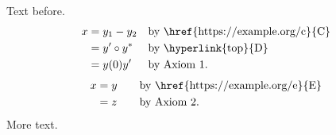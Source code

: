 \documentclass{article}
\begin{document}
Text before.
\begin{align}
x& = y_1-y_2 && \text{by \href{https://example.org/c}{C}}\\
 & = y'\circ y^* && \text{by \hyperlink{top}{D}}\\
 & = y(0) y' && \text{by Axiom 1.}
\end{align}
\begin{alignat}{2}
x& = y &\quad& \text{by \href{https://example.org/e}{E}}\\
 & = z && \text{by Axiom 2.}
\end{alignat}
More text.\hypertarget{top}{}
\end{document}
